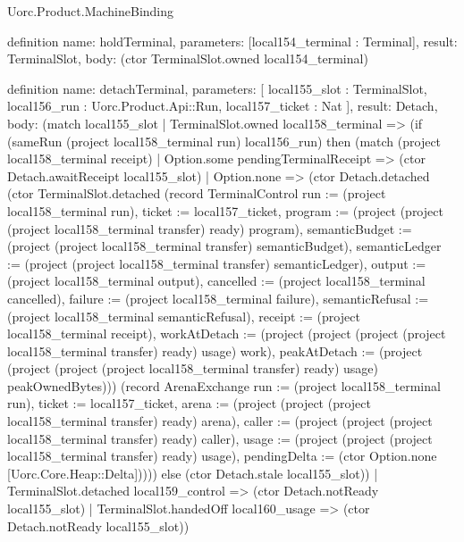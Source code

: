 \begin{lexlean}{Uorc.Product.MachineBinding}
\begin{semanticmodule}
definition{
  name: holdTerminal,
  parameters: [local154_terminal : Terminal],
  result: TerminalSlot,
  body: (ctor TerminalSlot.owned local154_terminal)
}

definition{
  name: detachTerminal,
  parameters: [
    local155_slot : TerminalSlot,
    local156_run : Uorc.Product.Api::Run,
    local157_ticket : Nat
  ],
  result: Detach,
  body: (match local155_slot
    | TerminalSlot.owned local158_terminal => (if (sameRun (project local158_terminal run) local156_run) then (match (project local158_terminal receipt)
      | Option.some pendingTerminalReceipt => (ctor Detach.awaitReceipt local155_slot)
      | Option.none => (ctor Detach.detached (ctor TerminalSlot.detached (record TerminalControl {run := (project local158_terminal run), ticket := local157_ticket, program := (project (project (project local158_terminal transfer) ready) program), semanticBudget := (project (project local158_terminal transfer) semanticBudget), semanticLedger := (project (project local158_terminal transfer) semanticLedger), output := (project local158_terminal output), cancelled := (project local158_terminal cancelled), failure := (project local158_terminal failure), semanticRefusal := (project local158_terminal semanticRefusal), receipt := (project local158_terminal receipt), workAtDetach := (project (project (project (project local158_terminal transfer) ready) usage) work), peakAtDetach := (project (project (project (project local158_terminal transfer) ready) usage) peakOwnedBytes)})) (record ArenaExchange {run := (project local158_terminal run), ticket := local157_ticket, arena := (project (project (project local158_terminal transfer) ready) arena), caller := (project (project (project local158_terminal transfer) ready) caller), usage := (project (project (project local158_terminal transfer) ready) usage), pendingDelta := (ctor Option.none [Uorc.Core.Heap::Delta])}))) else (ctor Detach.stale local155_slot))
    | TerminalSlot.detached local159_control => (ctor Detach.notReady local155_slot)
    | TerminalSlot.handedOff local160_usage => (ctor Detach.notReady local155_slot))
}


\end{semanticmodule}
\end{lexlean}
